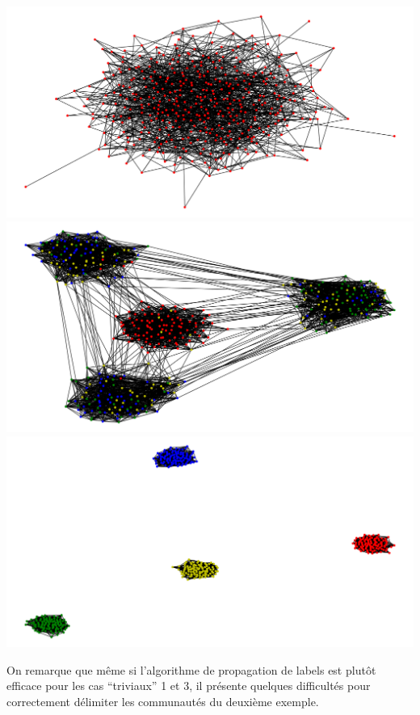\documentclass{report}
\begin{document}
\begin{center}
  \includegraphics[width=0.3\paperwidth]{assets/0101coms.png}\\
  \includegraphics[width=0.3\paperwidth]{assets/01001coms.png}\\
  \includegraphics[width=0.3\paperwidth]{assets/01000001coms.png}\\
\end{center}

On remarque que même si l'algorithme de propagation de labels est plutôt efficace pour les cas ``triviaux'' 1 et 3, il présente quelques difficultés pour correctement délimiter les communautés du deuxième exemple.
\end{document}
